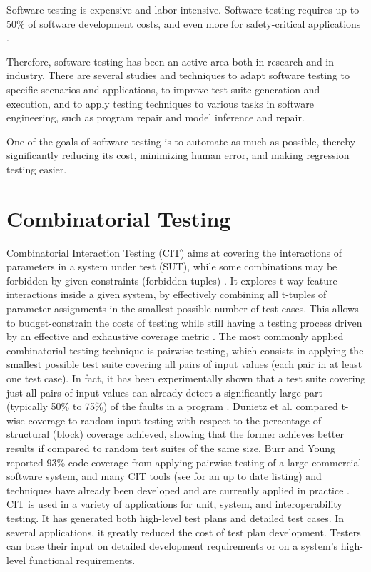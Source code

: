 \documentclass[
12pt, %
oneside, %
english, %
singlespacing, %
headsepline, %
consistentlayout, %
]{MastersDoctoralThesis} %
\theoremstyle{plain}
\theoremstyle{definition}
\theoremstyle{remark}
\theoremstyle{remark}
\theoremstyle{plain}
\theoremstyle{plain}
\theoremstyle{remark}
\begin{document}
Software testing is expensive and labor intensive. Software testing requires up to 50\% of software development costs, and even more for safety-critical applications \cite{testingbook}.

Therefore, software testing has been an active area both in research and in industry.
There are several studies and techniques to adapt software testing to specific scenarios and applications, to improve test suite generation and execution, and to apply testing techniques to various tasks in software engineering, such as program repair and model inference and repair. 

One of the goals of software testing is to automate as much as possible, thereby significantly reducing its cost, minimizing human error, and making regression testing easier. \cite{testingbook}

\section{Combinatorial Testing}
Combinatorial Interaction Testing (CIT) aims at covering the interactions of parameters in a system under test (SUT), while some combinations may be forbidden by given constraints (forbidden tuples) \cite{yamada_greedy_2016}.
It explores t-way feature interactions inside a given system, by effectively combining all t-tuples of parameter assignments in the smallest possible number of test cases.
This allows to budget-constrain the costs of testing while still having a testing process driven by an effective and exhaustive coverage metric \cite{AETG,KuhnTSE04}. 
The most commonly applied combinatorial testing technique is pairwise testing, which consists in applying the smallest possible test suite covering all pairs of input values (each pair in at least one test case). 
In fact, it has been experimentally shown that a test suite covering just all pairs of input values can already detect a significantly large part (typically 50\% to 75\%) of the faults in a program \cite{Dalal:ICSE99, IPO}.
Dunietz et al. \cite{Dunietz:ICSE97} compared t-wise coverage to random input testing with respect to the percentage of structural (block) coverage achieved, showing that the former achieves better results if compared to random test suites of the same size. 
Burr and Young \cite{burr98} reported 93\% code coverage from applying pairwise testing of a large commercial software system, and many CIT tools (see \cite{pairwise} for an up to date listing) and techniques have already been developed \cite{AETGT.ISSRE.1998,GrindalSTVR05,KuhnTSE04} and are currently applied in practice \cite{OATS,Kuhn02,Smith}. 
CIT is used in a variety of applications for unit, system, and interoperability testing. 
It has generated both high-level test plans and detailed test cases. In several applications, it greatly reduced the cost of test plan development. Testers can base their input on detailed development requirements or on a system's high-level functional requirements.
\end{document}
